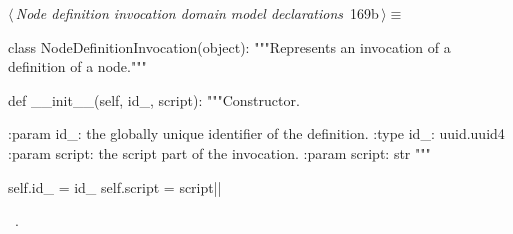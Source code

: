 \documentclass[%
    a4paper,    %
    justified,  %
    nobib,      %
    openany     %
]{tufte-book}
\begin{document}
\begin{flushleft} \small
\begin{minipage}{\linewidth}\label{scrap200}\raggedright\small
{} $\langle\,${\itshape Node definition invocation domain model declarations}\nobreak\ {\footnotesize {169b}}$\,\rangle\equiv$
\vspace{-1ex}
\begin{pythoncode}
class NodeDefinitionInvocation(object):
    """Represents an invocation of a definition of a node."""

    def __init__(self, id_, script):
        """Constructor.

        :param id_: the globally unique identifier of the definition.
        :type  id_: uuid.uuid4
        :param script: the script part of the invocation.
        :param script: str
        """

        self.id_ = id_
        self.script = script|\NWsep|
\end{pythoncode}
\vspace{1.5ex}
\footnotesize
\begin{list}{}{\setlength{\itemsep}{-\parsep}\setlength{\itemindent}{-\leftmargin}}
\item \NWtxtMacroRefIn\ .

\item{}
\end{list}
\end{minipage}\vspace{4ex}
\end{flushleft}
\end{document}
